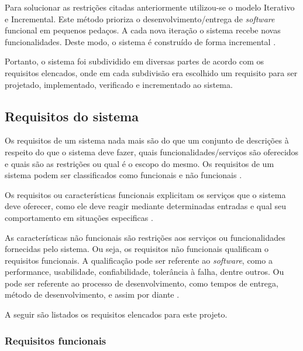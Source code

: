 Para solucionar as restrições citadas anteriormente utilizou-se o modelo Iterativo e Incremental. Este método prioriza o desenvolvimento/entrega de \textit{software} funcional em pequenos pedaços. A cada nova iteração o sistema recebe novas funcionalidades. Deste modo, o sistema é construído de forma incremental \cite{SITEINTERATIVOINCREMENTAL}.

Portanto, o sistema foi subdividido em diversas partes de acordo com os requisitos elencados, onde em cada subdivisão era escolhido um requisito para ser projetado, implementado, verificado e incrementado ao sistema.

\subsection{Requisitos do sistema} \label{subsec:requisitos}

Os requisitos de um sistema nada mais são do que um conjunto de descrições à respeito do que o sistema deve fazer, quais funcionalidades/serviços são oferecidos e quais são as restrições ou qual é o escopo do mesmo. Os requisitos de um sistema podem ser classificados como funcionais e não funcionais \cite{sommerville2011engenharia}.

Os requisitos ou características funcionais explicitam os serviços que o sistema deve oferecer, como ele deve reagir mediante determinadas entradas e qual seu comportamento em situações especificas \cite{sommerville2011engenharia, engsoftwilson}.

As características não funcionais são restrições aos serviços ou funcionalidades fornecidas pelo sistema. Ou seja, os requisitos não funcionais qualificam o requisitos funcionais. A qualificação pode ser referente ao \textit{software}, como a performance, usabilidade, confiabilidade, tolerância à falha, dentre outros. Ou pode ser referente ao processo de desenvolvimento, como tempos de entrega, método de desenvolvimento, e assim por diante \cite{introrequisitos}.

A seguir são listados os requisitos elencados para este projeto.


\subsubsection{Requisitos funcionais}

